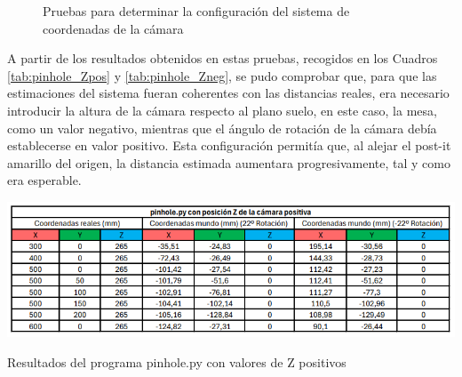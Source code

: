  \begin{figure}[H]
    \begin{center}
      \subcapcentertrue
      \hspace{2mm}
    \end{center}
    \caption{Pruebas para determinar la configuración del sistema de coordenadas de la cámara}
    \label{fig:prueba_ejes_camara}
  \end{figure}
  
A partir de los resultados obtenidos en estas pruebas, recogidos en los Cuadros \ref{tab:pinhole_Zpos} y \ref{tab:pinhole_Zneg}, se pudo comprobar que, para que las estimaciones del sistema fueran coherentes con las distancias reales, era necesario introducir la altura de la cámara respecto al plano suelo, en este caso, la mesa, como un valor negativo, mientras que el ángulo de rotación de la cámara debía establecerse en valor positivo. Esta configuración permitía que, al alejar el post-it amarillo del origen, la distancia estimada aumentara progresivamente, tal y como era esperable. 
  
  \begin{table}[H]
    \centering
    \begin{center}
      \includegraphics[width=150mm]{figs/pinhole con Z positiva.png}
    \end{center}
    \caption{Resultados del programa pinhole.py con valores de Z positivos}
    \label{tab:pinhole_Zpos}
  \end{table}
  
